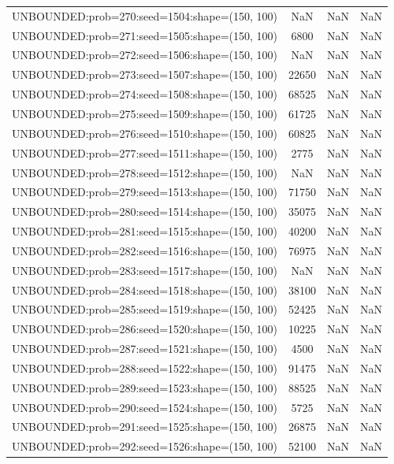 \begin{longtable}{lccc}
UNBOUNDED:prob=270:seed=1504:shape=(150, 100) &   NaN &   NaN &    NaN \\
UNBOUNDED:prob=271:seed=1505:shape=(150, 100) &  6800 &   NaN &    NaN \\
UNBOUNDED:prob=272:seed=1506:shape=(150, 100) &   NaN &   NaN &    NaN \\
UNBOUNDED:prob=273:seed=1507:shape=(150, 100) & 22650 &   NaN &    NaN \\
UNBOUNDED:prob=274:seed=1508:shape=(150, 100) & 68525 &   NaN &    NaN \\
UNBOUNDED:prob=275:seed=1509:shape=(150, 100) & 61725 &   NaN &    NaN \\
UNBOUNDED:prob=276:seed=1510:shape=(150, 100) & 60825 &   NaN &    NaN \\
UNBOUNDED:prob=277:seed=1511:shape=(150, 100) &  2775 &   NaN &    NaN \\
UNBOUNDED:prob=278:seed=1512:shape=(150, 100) &   NaN &   NaN &    NaN \\
UNBOUNDED:prob=279:seed=1513:shape=(150, 100) & 71750 &   NaN &    NaN \\
UNBOUNDED:prob=280:seed=1514:shape=(150, 100) & 35075 &   NaN &    NaN \\
UNBOUNDED:prob=281:seed=1515:shape=(150, 100) & 40200 &   NaN &    NaN \\
UNBOUNDED:prob=282:seed=1516:shape=(150, 100) & 76975 &   NaN &    NaN \\
UNBOUNDED:prob=283:seed=1517:shape=(150, 100) &   NaN &   NaN &    NaN \\
UNBOUNDED:prob=284:seed=1518:shape=(150, 100) & 38100 &   NaN &    NaN \\
UNBOUNDED:prob=285:seed=1519:shape=(150, 100) & 52425 &   NaN &    NaN \\
UNBOUNDED:prob=286:seed=1520:shape=(150, 100) & 10225 &   NaN &    NaN \\
UNBOUNDED:prob=287:seed=1521:shape=(150, 100) &  4500 &   NaN &    NaN \\
UNBOUNDED:prob=288:seed=1522:shape=(150, 100) & 91475 &   NaN &    NaN \\
UNBOUNDED:prob=289:seed=1523:shape=(150, 100) & 88525 &   NaN &    NaN \\
UNBOUNDED:prob=290:seed=1524:shape=(150, 100) &  5725 &   NaN &    NaN \\
UNBOUNDED:prob=291:seed=1525:shape=(150, 100) & 26875 &   NaN &    NaN \\
UNBOUNDED:prob=292:seed=1526:shape=(150, 100) & 52100 &   NaN &    NaN \\

\end{longtable}
